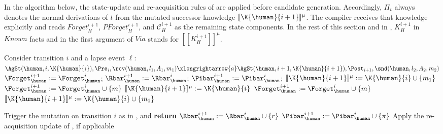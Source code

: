 In the algorithm below, the state-update and re-acquisition rules of  are applied before candidate generation.  Accordingly, $\Pi_t$ always denotes the normal derivations of $t$ from the mutated successor knowledge $[\![\K{\human}{i+1}]\!]^\mu$.
The compiler receives that knowledge explicitly and reads $\mathit{Forget}^{i+1}_H$, $\mathit{PForget}^{i+1}_H$, and $\mathcal{C}^{i+1}_H$ as the remaining state components. In the rest of this section and in , $K^{i+1}_H$ in $\mathit{Known}$ facts and in the first argument of $\mathit{Via}$ stands for $[\![K^{i+1}_H]\!]^{\mu}$.


\begin{algorithm*}[htbp]
\caption{$\mutation_{\forget{}-DL}^{\human}$: Forgetting in transition $i$ under Defeasible Logic}
\label{Alg:ForgetMutation2}
\begin{algorithmic}[1]
    \State Consider transition $i$ and a lapse event $\ell$:
    $\AgSt(\human, i, \K{\human}{i}), \Pre_i, \rcv(\human, l_1, A_1, m_1)
    \xlongrightarrow{a}
    \AgSt(\human, i+1, \K{\human}{i+1}), \Post_{i+1},
    \snd(\human, l_2, A_2, m_2)$
    \State $\Forget_{\human}^{i+1} := \Forget_{\human}^{i}$;\quad
           $\Rbar_{\human}^{i+1} := \Rbar_{\human}^{i}$;\quad
           $\Pibar_{\human}^{i+1} := \Pibar_{\human}^{i}$;\quad
           $[\![\K{\human}{i+1}]\!]^\mu := \K{\human}{i} \cup \{m_1\}$
        \State $\Forget_{\human}^{i+1} := \Forget_{\human}^{i}\cup\{m\}$
            \State $[\![\K{\human}{i+1}]\!]^\mu := \K{\human}{i}$
        \Else
            \State $\Forget_{\human}^{i+1} := \Forget_{\human}^{i}\cup\{m\}$
            \State $[\![\K{\human}{i+1}]\!]^\mu := \K{\human}{i}\cup\{m_1\}$
        \EndIf
                
            \State Trigger the \neglect{} mutation on transition $i$ as in
                   , and \textbf{return}
        \EndIf
        \State $\Rbar_{\human}^{i+1} := \Rbar_{\human}^{i}\cup\{r\}$
        \State $\Pibar_{\human}^{i+1} := \Pibar_{\human}^{i}\cup\{\pi\}$
    \EndIf
    \State Apply the re-acquisition update of , if applicable


\end{algorithmic}
\end{algorithm*}
